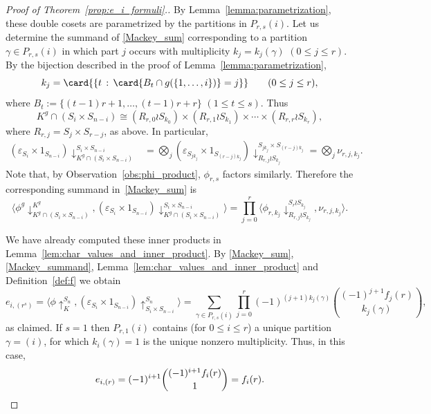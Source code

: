 \begin{proof}[Proof of  Theorem~\ref{prop:e_i_formuli}.]
    By Lemma~\ref{lemma:parametrization}, 
    these double cosets are parametrized by the partitions in $P_{r,s}(i)$.  Let us determine the summand of \eqref{Mackey_sum} 
    corresponding to a partition $\gamma\in P_{r,s}(i)$ in which part $j$ occurs with multiplicity $k_j = k_j(\gamma)$ $(0 \le j \le r)$. 
    By the bijection described in the proof of Lemma~\ref{lemma:parametrization}, 
    \[
        k_j = \card{\{t \,:\, \card{B_t \cap g(\{1, \ldots, i\})} = j\}}
        \qquad (0 \le j \le r),
    \]
    where $B_t := \{(t-1)r+1,\ldots,(t-1)r+r\}$ $(1 \le t \le s)$. Thus
    \[
        K^g \cap (S_i \times S_{n-i})
        \cong (R_{r,0} \wr S_{k_0}) \times (R_{r,1} \wr S_{k_1}) \times \cdots \times (R_{r,r}\wr S_{k_r}),
    \]
    where $R_{r,j} = S_j \times S_{r-j}$, as above. In particular,
    \begin{align*}
        (\varepsilon_{S_i} \times 1_{S_{n-i}})\downarrow^{S_i \times S_{n-i}}_{K^g \cap (S_i \times S_{n-i})}
        &= \bigotimes_j (\varepsilon_{S_{jk_j}} \times 1_{S_{(r-j)k_j}})\downarrow^{S_{jk_j} \times S_{(r-j)k_j}}_{R_{r,j}\wr S_{k_j}}
        = \bigotimes_j \nu_{r,j,k_j}.
    \end{align*}
    Note that, by Observation~\ref{obs:phi_product}, $\phi_{r,s}$ factors similarly.
    Therefore the corresponding summand in~\eqref{Mackey_sum} is
    \begin{equation}\label{Mackey_summand}
        \langle \phi^g\downarrow^{K^g}_{K^g \cap (S_i \times S_{n-i})},
        (\varepsilon_{S_i} \times 1_{S_{n-i}})\downarrow^{S_i \times S_{n-i}}_{K^g \cap (S_i \times S_{n-i})} \rangle 
        = \prod_{j=0}^{r} \langle \phi_{r,k_j}\downarrow^{S_r\wr S_{k_j}}_{R_{r,j}\wr S_{k_j}}, \nu_{r,j,k_j} \rangle.
    \end{equation}
		
    We have already computed these inner products in Lemma~\ref{lem:char_values_and_inner_product}.
    By \eqref{Mackey_sum}, \eqref{Mackey_summand}, Lemma~\ref{lem:char_values_and_inner_product}
    and Definition~\ref{def:f} we obtain
    \[
        e_{i,(r^s)} 
        = \langle \phi\uparrow_K^{S_n}, (\varepsilon_{S_i} \times 1_{S_{n-i}})\uparrow_{S_i \times S_{n-i}}^{S_n} \rangle
        = \sum_{\gamma\in P_{r,s}(i)} \prod_{j=0}^{r} 
        (-1)^{(j+1)k_j(\gamma)} \binom{(-1)^{j+1} f_j(r)}{k_j(\gamma)},
    \]
    as claimed.
    If $s=1$ then $P_{r,1}(i)$ contains (for $0 \le i \le r$) 
    a unique partition $\gamma = (i)$, for which $k_i(\gamma) = 1$ is the unique nonzero multiplicity. Thus, in this case,  
    \[
        e_{i,(r)} 
        = (-1)^{i+1} \binom{(-1)^{i+1}f_i(r)}{1} 
        = f_i(r).
        \qedhere
    \]
\end{proof}
 
